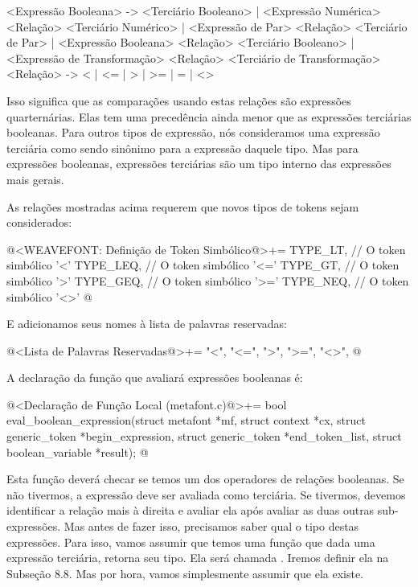 {{{{{{\alinhaverbatim
<Expressão Booleana> -> <Terciário Booleano> |
                        <Expressão Numérica> <Relação> <Terciário Numérico> |
                        <Expressão de Par> <Relação> <Terciário de Par>     |
                        <Expressão Booleana> <Relação> <Terciário Booleano> |
                        <Expressão de Transformação> <Relação>
                                           <Terciário de Transformação>
<Relação> -> < | <= | > | >= | = | <>
\alinhanormal

Isso significa que as comparações usando estas relações são expressões
quarternárias. Elas tem uma precedência ainda menor que as expressões
terciárias booleanas. Para outros tipos de expressão, nós consideramos
uma expressão terciária como sendo sinônimo para a expressão daquele
tipo. Mas para expressões booleanas, expressões terciárias são um tipo
interno das expressões mais gerais.

As relações mostradas acima requerem que novos tipos de tokens sejam
considerados:

\iniciocodigo
@<WEAVEFONT: Definição de Token Simbólico@>+=
TYPE_LT,                    // O token simbólico '<'
TYPE_LEQ,                   // O token simbólico '<='
TYPE_GT,                    // O token simbólico '>'
TYPE_GEQ,                   // O token simbólico '>='
TYPE_NEQ,                   // O token simbólico '<>'
@
\fimcodigo

E adicionamos seus nomes à lista de palavras reservadas:

\iniciocodigo
@<Lista de Palavras Reservadas@>+=
"<", "<=", ">", ">=", "<>",
@
\fimcodigo

A declaração da função que avaliará expressões booleanas é:

\iniciocodigo
@<Declaração de Função Local (metafont.c)@>+=
bool eval_boolean_expression(struct metafont *mf, struct context *cx,
                             struct generic_token *begin_expression,
                             struct generic_token *end_token_list,
                             struct boolean_variable *result);
@
\fimcodigo

Esta função deverá checar se temos um dos operadores de relações
booleanas. Se não tivermos, a expressão deve ser avaliada como
terciária. Se tivermos, devemos identificar a relação mais à direita e
avaliar ela após avaliar as duas outras sub-expressões. Mas antes de
fazer isso, precisamos saber qual o tipo destas expressões. Para isso,
vamos assumir que temos uma função que dada uma expressão terciária,
retorna seu tipo. Ela será
chamada . Iremos definir
ela na Subseção 8.8. Mas por hora, vamos simplesmente assumir que ela
existe.

}}}}}}
